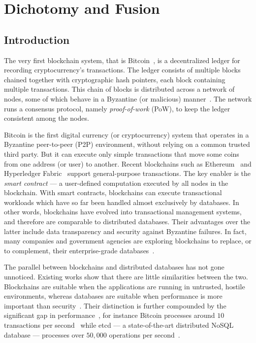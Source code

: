 \chapter{Dichotomy and Fusion}
\label{ch:twin}
\section{Introduction}
\label{ch:twin:intro}

The very first blockchain system, that is Bitcoin~\cite{nakamoto2019bitcoin}, is a decentralized ledger for
recording cryptocurrency's transactions. The ledger consists of multiple blocks chained together with cryptographic
hash pointers, each block containing multiple transactions. This chain of blocks is distributed    
across a network of nodes, some of which behave in a Byzantine (or malicious) manner~\cite{Lamport_BFT}. The network runs a
consensus protocol, namely \textit{proof-of-work} (PoW), to keep the ledger consistent among the nodes.  

Bitcoin is the first digital currency (or cryptocurrency) system that
operates in a Byzantine \cite{Lamport_BFT} peer-to-peer (P2P) environment, without relying on a common trusted
third party.
But it can execute only simple transactions that move some coins from one address (or user) to another.
Recent blockchains such as Ethereum~\cite{wood2014ethereum} and Hyperledger
Fabric~\cite{androulaki2018hyperledger} support general-purpose transactions. The key enabler is the {\em
smart contract} --- a user-defined computation executed by all nodes in the blockchain. 
With smart contracts, blockchains can execute transactional workloads which have so far been handled almost
exclusively by 
databases.  In other words, blockchains have evolved into transactional management systems, and therefore are
comparable to distributed databases. Their advantages over the latter include data transparency and security
against Byzantine failures. 
In fact, many companies and government agencies are exploring blockchains to replace, or to complement, their
enterprise-grade databases~\cite{mougayar2016business,morabito2017business,crosby2016blockchain}.

The parallel between blockchains and distributed databases has not gone
unnoticed. Existing works show that there are little similarities between the
two. Blockchains are suitable when the applications are running in untrusted,
hostile environments, whereas databases are suitable when performance is more
important than security~\cite{crosby2016blockchain,
wust2018you,chowdhury2018blockchain,yaga2018blockchain}. Their distinction is
further compounded by the significant gap in
performance~\cite{dinh2017blockbench}, for instance Bitcoin processes around
$10$ transactions per second~\cite{bitcoin_tps} while etcd --- a
state-of-the-art distributed NoSQL database --- processes over $50,000$
operations per second~\cite{etcd_perf}.

